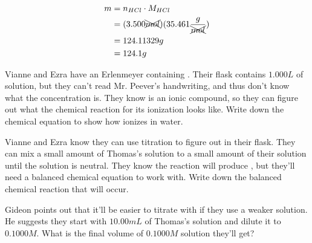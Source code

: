\documentclass[11pt,addpoints]{exam}   	%
\begin{document}
\begin{questions}
\begin{solution}
\begin{equation} 
\begin{split}
    m &= n_{HCl} \cdot M_{HCl} \\
        &= (3.500 \xcancel{mol}) (35.461 \frac{g}{\xcancel{mol}}) \\
        &= 124.11329 g \\
        &= 124.1 g
 \end{split}
 \end{equation}
\end{solution}

\vspace{0.2in}

\question[5] Vianne and Ezra have an Erlenmeyer containing . Their flask contains $1.000 L$ of  solution, but they can't read Mr. Peever's handwriting, and thus don't know what the concentration is. They know  is an ionic compound, so they can figure out what the chemical reaction for its ionization looks like.
 Write down the chemical equation to show how  ionizes in water.

\begin{solution}
\end{solution}

\vspace{0.2in}

\question[5] Vianne and Ezra know they can use titration to figure out \ce{[NaOH]} in their flask. They can mix a small amount of Thomas's  solution to a small amount of their  solution until the solution is neutral. They know the reaction will produce , but they'll need a balanced chemical equation to work with.
Write down the balanced chemical reaction that will occur.

\begin{solution}
\end{solution}

\vspace{0.2in}

\question[5] Gideon points out that it'll be easier to titrate  with  if they use a weaker solution. He suggests they start with $10.00 mL$ of Thomas's solution and dilute it to $0.1000 M$.
What is the final volume of $0.1000 M$ solution they'll get?


\end{questions}
\end{document}
